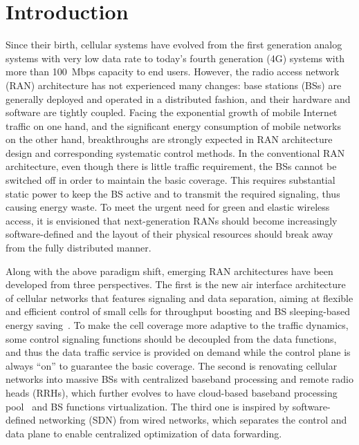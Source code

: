 \documentclass[12pt, draftclsnofoot,onecolumn]{IEEEtran}
\begin{document}
\section{Introduction}

Since their birth, cellular systems have evolved from the
first generation analog systems with very low data rate to today's fourth generation
(4G) systems with more than \SI{100}{Mbps} capacity to end users. However, the
radio access network (RAN) architecture has not experienced many changes:
base stations (BSs) are generally deployed and operated in a distributed fashion,
and their hardware and software are tightly coupled.
Facing the exponential growth of mobile Internet traffic on
one hand, and the significant energy consumption of mobile networks on the
other hand, breakthroughs are strongly expected in
RAN architecture design and corresponding systematic control methods. In the conventional RAN architecture,
even though there is little traffic requirement, the BSs cannot be switched off in order to maintain the basic coverage. This requires substantial static power to keep the BS active and to transmit the required signaling, thus causing energy waste.
To meet the urgent need for green and elastic wireless access, it is envisioned that
next-generation RANs should become increasingly software-defined
and the layout of their physical resources should break away from the fully distributed manner.

Along with the above paradigm shift, emerging RAN architectures have been developed
from three perspectives. The first is the new air interface architecture of
cellular networks that features signaling and data separation, aiming
at flexible and efficient control of small cells for throughput boosting and
BS sleeping-based energy
saving~\cite{niu2012energy,ishii2012novel}. To make the cell coverage more adaptive to the traffic
dynamics, some control signaling functions should be
decoupled from the data functions, and thus the data traffic service
is provided on demand while the control plane is always ``on'' to guarantee the
basic coverage. The second is renovating cellular networks into massive BSs with centralized
baseband processing and remote radio heads (RRHs), which further evolves to
have cloud-based baseband processing pool~\cite{cmri2013cran} and BS functions
virtualization. The third one is inspired by software-defined networking (SDN)
from wired networks, which separates the control and data
plane to enable centralized optimization of data forwarding.
\end{document}
